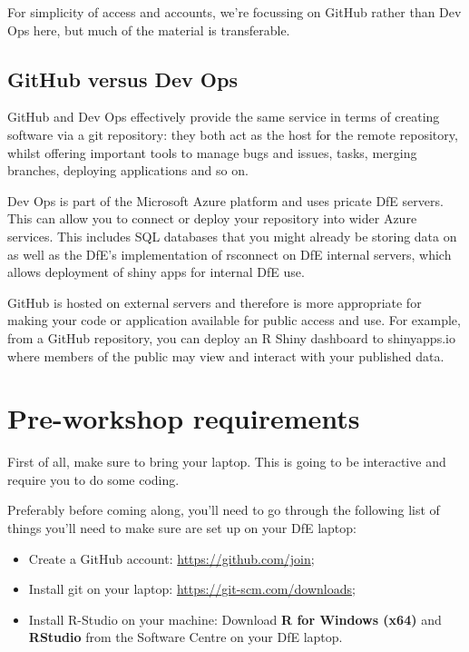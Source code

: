 \documentclass[
  12pt,
]{article}
\providecommand{\tightlist}{%
  \setlength{\itemsep}{0pt}\setlength{\parskip}{0pt}}
\begin{document}
For simplicity of access and accounts, we're focussing on GitHub rather
than Dev Ops here, but much of the material is transferable.

\hypertarget{github-versus-dev-ops}{%
\subsection{GitHub versus Dev Ops}\label{github-versus-dev-ops}}

GitHub and Dev Ops effectively provide the same service in terms of
creating software via a git repository: they both act as the host for
the remote repository, whilst offering important tools to manage bugs
and issues, tasks, merging branches, deploying applications and so on.

Dev Ops is part of the Microsoft Azure platform and uses pricate DfE
servers. This can allow you to connect or deploy your repository into
wider Azure services. This includes SQL databases that you might already
be storing data on as well as the DfE's implementation of rsconnect on
DfE internal servers, which allows deployment of shiny apps for internal
DfE use.

GitHub is hosted on external servers and therefore is more appropriate
for making your code or application available for public access and use.
For example, from a GitHub repository, you can deploy an R Shiny
dashboard to shinyapps.io where members of the public may view and
interact with your published data.

\hypertarget{pre-workshop-requirements}{%
\section{Pre-workshop requirements}\label{pre-workshop-requirements}}

First of all, make sure to bring your laptop. This is going to be
interactive and require you to do some coding.

Preferably before coming along, you'll need to go through the following
list of things you'll need to make sure are set up on your DfE laptop:

\begin{itemize}
\tightlist
\item
  Create a GitHub account: \url{https://github.com/join};
\item
  Install git on your laptop: \url{https://git-scm.com/downloads};
\item
  Install R-Studio on your machine: Download \textbf{R for Windows
  (x64)} and \textbf{RStudio} from the Software Centre on your DfE
  laptop.
\end{itemize}
\end{document}
